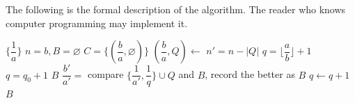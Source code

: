 The following is the formal description of the algorithm. The reader who knows computer programming may implement it.

\begin{algorithmic}[1]
    \State \Return $\{\dfrac{1}{a}\}$
  \EndIf
  \State $n = b, B = \varnothing$
  \State $C = \{(\dfrac{b}{a}, \varnothing)\}$
    \State $(\dfrac{b}{a}, Q) \gets $   
    \State $n' = n - |Q|$                            
    \State $q = \lfloor \dfrac{a}{b} \rfloor + 1$
      
      \State $q = q_0 + 1$
    \EndIf
       
        \State \Return $B$
      \EndIf
      \State $\dfrac{b'}{a'} = $  
        \State compare $\{\dfrac{1}{a'}, \dfrac{1}{q}\} \cup Q$ and $B$, record the better as $B$
      \Else
        \State {} 
      \EndIf
      \State $q \gets q + 1$
    \EndWhile
  \EndWhile
  \State \Return $B$
\EndFunction
\end{algorithmic}

